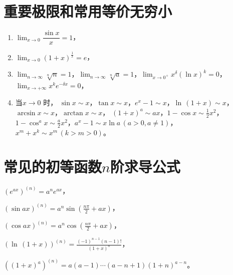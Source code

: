 \documentclass[UTF8]{ctexbook}
\begin{document}
\section{重要极限和常用等价无穷小}
  \begin{enumerate}[(1)]%
    \item $ \lim_{x \to 0}\dfrac{\sin x}{x}=1 $，
    \item $ \lim_{x \to 0}(1+x)^{\frac{1}{x}}=e $，
    \item $ \lim_{n \to \infty}\sqrt[n]{n}=1 $，$ \lim_{n \to \infty}\sqrt[n]{a}=1 $，$ \lim_{x \to 0^+}x^\delta (\ln x)^k=0 $，$ \lim_{x \to +\infty}x^k e^{-\delta x}=0 $，
    \item 当$x \to 0$ 时，
    $ \sin x \sim x $，$ \tan x \sim x $，$ e^x-1\sim x $，$ \ln\, (1+x)\sim x $，$ \arcsin x \sim x $，$ \arctan x \sim x $，
    $ (1+x)^a\sim ax $，$ 1-\cos x \sim \frac{1}{2}x^2 $，$ 1-\cos^a x \sim \frac{a}{2}x^2 $，$ a^x-1\sim x\ln a \,(a>0,a\ne 1) $，$ x^m+x^k \sim x^m \,(k>m>0) $。
  \end{enumerate}


\section{常见的初等函数$n$阶求导公式}
  \begin{tabenum}[(1)] \qquad \qquad
    \item $ (e^{ax})^{(n)}=a^n e^{ax} $，\\
    \item $ (\sin ax)^{(n)}=a^n\sin (\frac{n\pi}{2}+ax) $，\\
    \item $ (\cos ax)^{(n)}=a^n\cos (\frac{n\pi}{2}+ax) $，\\
    \item $ (\ln\,(1+x))^{(n)}=\frac{(-1)^{n-1}(n-1)!}{(1+x)^n} $，\\
    \item $ ((1+x)^a)^{(n)}=a(a-1)\cdots (a-n+1)(1+n)^{a-n} $。
  \end{tabenum}
\end{document}
